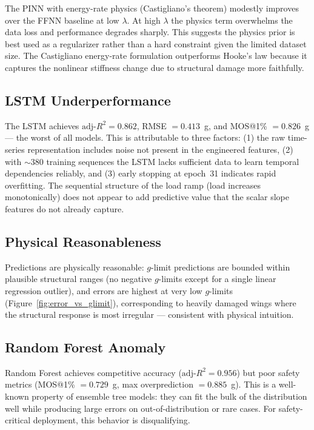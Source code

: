 \documentclass[10pt,letterpaper]{article}
\newcommand{\adjRsq}{\text{adj-}R^2}
\begin{document}
The PINN with energy-rate physics (Castigliano's theorem) modestly improves over the FFNN
baseline at low $\lambda$. At high $\lambda$ the physics term overwhelms the data loss and
performance degrades sharply. This suggests the physics prior is best used as a regularizer
rather than a hard constraint given the limited dataset size. The Castigliano energy-rate
formulation outperforms Hooke's law because it captures the nonlinear stiffness change due
to structural damage more faithfully.

\subsection{LSTM Underperformance}

The LSTM achieves $\adjRsq = 0.862$, RMSE $= 0.413$~g, and MOS@1\% $= 0.826$~g --- the
worst of all models. This is attributable to three factors: (1) the raw time-series
representation includes noise not present in the engineered features, (2) with $\sim$380
training sequences the LSTM lacks sufficient data to learn temporal dependencies reliably,
and (3) early stopping at epoch~31 indicates rapid overfitting. The sequential structure of
the load ramp (load increases monotonically) does not appear to add predictive value that
the scalar slope features do not already capture.

\subsection{Physical Reasonableness}

Predictions are physically reasonable: $g$-limit predictions are bounded within plausible
structural ranges (no negative $g$-limits except for a single linear regression outlier),
and errors are highest at very low $g$-limits (Figure~\ref{fig:error_vs_glimit}),
corresponding to heavily damaged wings where the structural response is most irregular ---
consistent with physical intuition.

\subsection{Random Forest Anomaly}

Random Forest achieves competitive accuracy ($\adjRsq = 0.956$) but poor safety metrics
(MOS@1\% $= 0.729$~g, max overprediction $= 0.885$~g). This is a well-known property of
ensemble tree models: they can fit the bulk of the distribution well while producing large
errors on out-of-distribution or rare cases. For safety-critical deployment, this behavior
is disqualifying.
\end{document}
